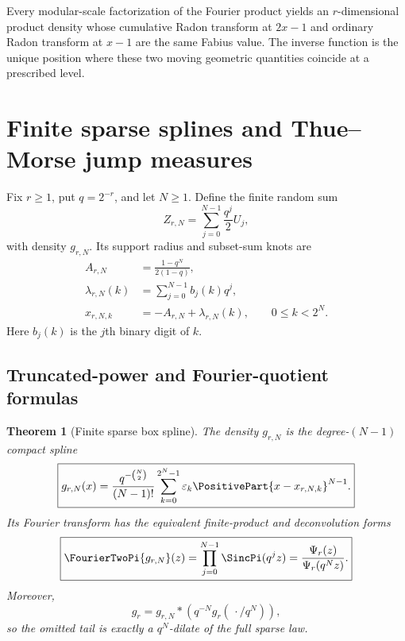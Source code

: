 \documentclass[11pt]{article}
\newtheorem{theorem}{Theorem}[section]
\theoremstyle{definition}
\theoremstyle{remark}
\newcommand{\eps}{\varepsilon}
\begin{document}
\begin{resultboxPartiv}
Every modular-scale factorization of the Fourier product yields an
$r$-dimensional product density whose cumulative Radon transform at $2x-1$ and
ordinary Radon transform at $x-1$ are the same Fabius value.  The inverse
function is the unique position where these two moving geometric quantities
coincide at a prescribed level.
\end{resultboxPartiv}

\section{Finite sparse splines and Thue--Morse jump measures}
\label{p5:sec:jump-measures}

Fix $r\ge1$, put $q=2^{-r}$, and let $N\ge1$.  Define the finite random sum
\begin{equation}
 Z_{r,N}=\sum_{j=0}^{N-1}\frac{q^j}{2}U_j,                 \label{p5:eq:ZrN}
\end{equation}
with density $g_{r,N}$.  Its support radius and subset-sum knots are
\begin{align}
 A_{r,N}&=\frac{1-q^N}{2(1-q)},                            \label{p5:eq:ArN}\\
 \lambda_{r,N}(k)&=\sum_{j=0}^{N-1}b_j(k)q^j,             \label{p5:eq:lambda-rNk}\\
 x_{r,N,k}&=-A_{r,N}+\lambda_{r,N}(k),
 \qquad 0\le k<2^N.                                      \label{p5:eq:x-rNk}
\end{align}
Here $b_j(k)$ is the $j$th binary digit of $k$.

\subsection{Truncated-power and Fourier-quotient formulas}

\begin{theorem}[Finite sparse box spline]
\label{p5:thm:sparse-box-spline}
The density $g_{r,N}$ is the degree-$(N-1)$ compact spline
\begin{equation}
 \boxed{\displaystyle
 g_{r,N}(x)=\frac{q^{-\binom N2}}{(N-1)!}
 \sum_{k=0}^{2^N-1}\eps_k\PositivePart{x-x_{r,N,k}}^{N-1}.}    \label{p5:eq:sparse-truncated-power}
\end{equation}
Its Fourier transform has the equivalent finite-product and deconvolution
forms
\begin{equation}
 \boxed{\displaystyle
 \FourierTwoPi{g_{r,N}}(z)
 =\prod_{j=0}^{N-1}\SincPi(q^jz)
 =\frac{\Psi_r(z)}{\Psi_r(q^Nz)}.}                        \label{p5:eq:g-rN-Fourier}
\end{equation}
Moreover,
\begin{equation}
 g_r=g_{r,N}*\left(q^{-N}g_r(\,\cdot/q^N)\right),         \label{p5:eq:exact-tail-convolution}
\end{equation}
so the omitted tail is exactly a $q^N$-dilate of the full sparse law.
\end{theorem}
\end{document}
